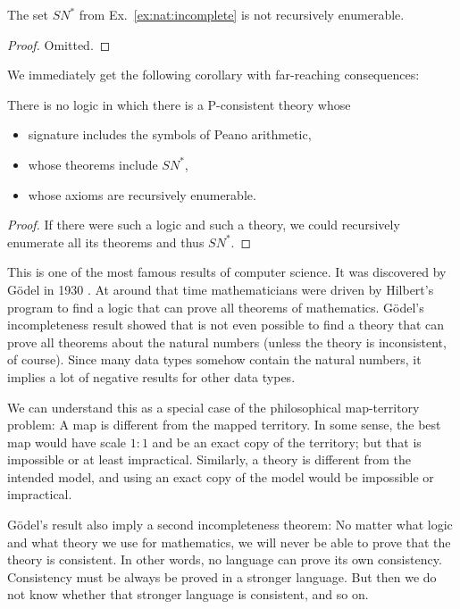 \begin{theorem}\label{thm:natincomplete}
The set $SN^*$ from Ex.~\ref{ex:nat:incomplete} is not recursively enumerable.
\end{theorem}
\begin{proof}
Omitted.
\end{proof}

We immediately get the following corollary with far-reaching consequences:

\begin{theorem}\label{thm:goedelincomplete}
There is no logic in which there is a P-consistent theory whose
  \begin{itemize}
    \item signature includes the symbols of Peano arithmetic,
    \item whose theorems include $SN^*$,
    \item whose axioms are recursively enumerable.
  \end{itemize}
\end{theorem}
\begin{proof}
If there were such a logic and such a theory, we could recursively enumerate all its theorems and thus $SN^*$.
\end{proof}

This is one of the most famous results of computer science.
It was discovered by G\"odel in 1930 \cite{goedelincompleteness}.
At around that time mathematicians were driven by Hilbert's program \cite{hilbertsprogram} to find a logic that can prove all theorems of mathematics.
G\"odel's incompleteness result showed that is not even possible to find a theory that can prove all theorems about the natural numbers (unless the theory is inconsistent, of course).
Since many data types somehow contain the natural numbers, it implies a lot of negative results for other data types.

We can understand this as a special case of the philosophical map-territory problem: A map is different from the mapped territory.
In some sense, the best map would have scale $1:1$ and be an exact copy of the territory; but that is impossible or at least impractical.
Similarly, a theory is different from the intended model, and using an exact copy of the model would be impossible or impractical.
\bigskip

G\"odel's result also imply a second incompleteness theorem: No matter what logic and what theory we use for mathematics, we will never be able to prove that the theory is consistent.
In other words, no language can prove its own consistency.
Consistency must be always be proved in a stronger language.
But then we do not know whether that stronger language is consistent, and so on.

